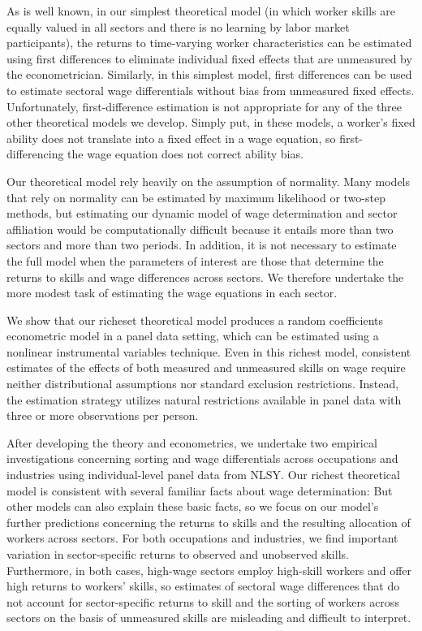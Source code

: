 \documentclass[12pt]{article}
\newcommand{\highlightP}[1]{{\emph{\color{MyPink}{#1}}}}
\theoremstyle{definition}
\begin{document}
As is well known, in our simplest theoretical model (in which worker skills are equally valued in all sectors and there is no learning by labor market participants), the returns to time-varying worker characteristics can be estimated using first differences to eliminate individual fixed effects that are unmeasured by the econometrician. Similarly, in this simplest model, first differences can be used to estimate sectoral wage differentials without bias from unmeasured fixed effects. Unfortunately, first-difference estimation is not appropriate for any of the three other theoretical models we develop. Simply put, in these models, a worker's fixed ability does not translate into a fixed effect in a wage equation, so first-differencing the wage equation does not correct ability bias. 

Our theoretical model rely heavily on the assumption of normality. Many models that rely on normality can be estimated by maximum likelihood or two-step methods, but estimating our dynamic model of wage determination and sector affiliation would be computationally difficult because it entails more than two sectors and more than two periods. In addition, it is not necessary to estimate the full model when the parameters of interest are those that determine the returns to skills and wage differences across sectors. We therefore undertake the more modest task of estimating the wage equations in each sector. 

We show that our richeset theoretical model produces a random coefficients econometric model in a panel data setting, which can be estimated using a nonlinear instrumental variables technique. Even in this richest model, consistent estimates of the effects of both measured and unmeasured skills on wage require neither distributional assumptions nor standard exclusion restrictions. Instead, the estimation strategy utilizes natural restrictions available in panel data with three or more observations per person. 

After developing the theory and econometrics, we undertake two empirical investigations concerning sorting and wage differentials across occupations and industries using individual-level panel data from NLSY. Our richest theoretical model is consistent with several familiar facts about wage determination: \highlightP{a typical individual’s wage increases with experience, the variance of the wage distribution across individuals increases with experience, and the skewness of the wage distribution increases with experience.} But other models can also explain these basic facts, so we focus on our model's further predictions concerning the returns to skills and the resulting allocation of workers across sectors. For both occupations and industries, we find important variation in sector-specific returns to observed and unobserved skills. Furthermore, in both cases, high-wage sectors employ high-skill workers and offer high returns to workers' skills, so estimates of sectoral wage differences that do not account for sector-specific returns to skill and the sorting of workers across sectors on the basis of unmeasured skills are misleading and difficult to interpret. 
\end{document}
